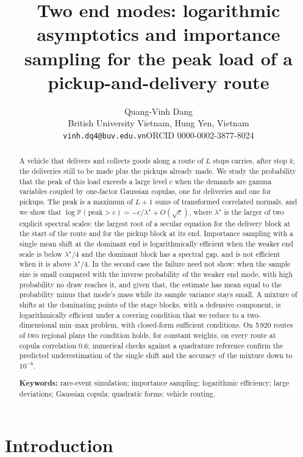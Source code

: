 \documentclass[11pt]{article}
\title{Two end modes: logarithmic asymptotics and importance sampling for the peak
load of a pickup-and-delivery route}
\author{Quang-Vinh Dang\\
British University Vietnam, Hung Yen, Vietnam\\
\texttt{vinh.dq4@buv.edu.vn}\quad ORCID 0000-0002-3877-8024}
\date{}
\theoremstyle{definition}
\theoremstyle{remark}
\renewcommand{\P}{\mathbb{P}}
\begin{document}
\maketitle

\begin{abstract}
A vehicle that delivers and collects goods along a route of $L$ stops carries, after
stop $k$, the deliveries still to be made plus the pickups already made. We study the
probability that the peak of this load exceeds a large level $c$ when the demands are
gamma variables coupled by one-factor Gaussian copulas, one for deliveries and one for
pickups. The peak is a maximum of $L+1$ sums of transformed correlated normals, and
we show that $\log\P(\text{peak}>c) = -c/\lambda^\star + O(\sqrt c)$, where
$\lambda^\star$ is the larger of two explicit spectral scales: the largest root of a
secular equation for the delivery block at the start of the route and for the pickup
block at its end. Importance sampling with a single mean shift at the dominant end is
logarithmically efficient when the weaker end scale is below $\lambda^\star/4$ and the
dominant block has a spectral gap, and is not efficient when it is above
$\lambda^\star/4$. In the second case the failure need not show: when the
sample size is small compared with the inverse probability of the weaker end mode, with
high probability no draw reaches it, and given that, the estimate has mean equal to the
probability minus that mode's mass while its sample variance stays small. A mixture of shifts at the
dominating points of the stage blocks, with a defensive component, is logarithmically
efficient under a covering condition that we reduce to a two-dimensional min--max
problem, with closed-form sufficient conditions. On 5\,920 routes of two regional plans
the condition holds, for constant weights, on every route at copula correlation $0.6$; numerical checks
against a quadrature reference confirm the predicted underestimation of the single
shift and the accuracy of the mixture down to $10^{-6}$.

\medskip\noindent\textbf{Keywords:} rare-event simulation; importance sampling;
logarithmic efficiency; large deviations; Gaussian copula; quadratic forms; vehicle
routing.
\end{abstract}

\section{Introduction}
\label{sec:intro}
\end{document}
